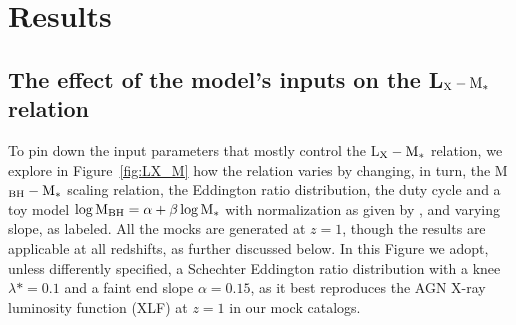 \section{Results}\label{sec:results}



\subsection{The effect of the model's inputs on the L$_{\rm X}-{\rm M}_*$ relation} \label{ssec:Fig2}

To pin down the input parameters that mostly control the L$_{\rm X}-{\rm M}_*$ relation, we explore in Figure~\ref{fig:LX_M} how the relation %
 varies by changing, in turn, the M$_{\rm BH}-{\rm M}_*$ scaling relation, the Eddington ratio distribution, the duty cycle and
 a toy model $\log {\rm M}_{\rm BH} = \alpha + \beta \log {\rm M}_*$ with normalization as given by \citet{2018ApJ...869..113D},
 and varying slope, as labeled. 
All the mocks are generated at $z=1$, though the results are applicable at all redshifts, as further discussed below.
In this Figure we adopt, unless differently specified, a Schechter Eddington ratio distribution with a knee $\lambda*=0.1$ and a faint end slope $\alpha=0.15$, as it best reproduces the AGN X-ray luminosity function (XLF) at $z=1$ in our mock catalogs.
 
